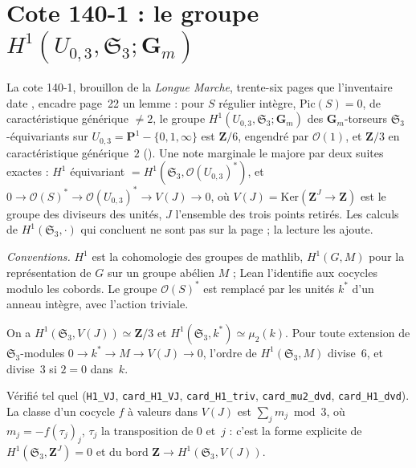 \section[Cote 140-1 : le groupe $H^1(U_{0,3}, \mathfrak S_3; \mathbf G_m)$]{Cote 140-1 : le groupe $H^1(U_{0,3}, \mathfrak S_3; \mathbf G_m)$\protect{}}\label{sec:140-1}

La cote 140-1, brouillon de la \emph{Longue Marche}, trente-six pages que l'inventaire date , encadre page~22 un lemme : pour $S$ régulier intègre, $\mathrm{Pic}(S) = 0$, de caractéristique générique $\neq 2$, le groupe $H^1(U_{0,3}, \mathfrak S_3; \mathbf G_m)$ des $\mathbf G_m$-torseurs $\mathfrak S_3$-équivariants sur $U_{0,3} = \mathbf P^1 - \{0, 1, \infty\}$ est $\mathbf Z/6$, engendré par $\mathcal O(1)$, et $\mathbf Z/3$ en caractéristique générique~$2$ (). Une note marginale le majore par deux suites exactes : $H^1$ équivariant $= H^1(\mathfrak S_3, \mathcal O(U_{0,3})^*)$, et $0 \to \mathcal O(S)^* \to \mathcal O(U_{0,3})^* \to V(J) \to 0$, où $V(J) = \mathrm{Ker}(\mathbf Z^J \to \mathbf Z)$ est le groupe des diviseurs des unités, $J$ l'ensemble des trois points retirés. Les calculs de $H^1(\mathfrak S_3, \cdot)$ qui concluent ne sont pas sur la page ; la lecture les ajoute.

\noindent\emph{Conventions.} $H^1$ est la cohomologie des groupes de mathlib, $H^1(G, M)$ pour la représentation de $G$ sur un groupe abélien $M$ ; Lean l'identifie aux cocycles modulo les cobords. Le groupe $\mathcal O(S)^*$ est remplacé par les unités $k^*$ d'un anneau intègre, avec l'action triviale.

\begin{encadre}
\begin{theoreme}\label{thm:140-1-majoration}
On a $H^1(\mathfrak S_3, V(J)) \simeq \mathbf Z/3$ et $H^1(\mathfrak S_3, k^*) \simeq \mu_2(k)$. Pour toute extension de $\mathfrak S_3$-modules $0 \to k^* \to M \to V(J) \to 0$, l'ordre de $H^1(\mathfrak S_3, M)$ divise~$6$, et divise~$3$ si $2 = 0$ dans~$k$.
\end{theoreme}
\end{encadre}

\noindent Vérifié tel quel (\texttt{H1\_VJ}, \texttt{card\_H1\_VJ}, \texttt{card\_H1\_triv}, \texttt{card\_mu2\_dvd}, \texttt{card\_H1\_dvd}). La classe d'un cocycle $f$ à valeurs dans $V(J)$ est $\sum_j m_j \bmod 3$, où $m_j = -f(\tau_j)_j$, $\tau_j$ la transposition de $0$ et~$j$ : c'est la forme explicite de $H^1(\mathfrak S_3, \mathbf Z^J) = 0$ et du bord $\mathbf Z \to H^1(\mathfrak S_3, V(J))$.

